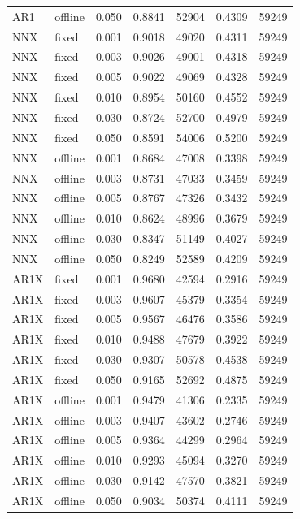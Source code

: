 \documentclass{article}
\begin{document}
\begin{longtable}[htbp]{l|l|l|*{4}{c}}
    AR1 & offline & 0.050 & 0.8841 & 52904 & 0.4309 & 59249\\
    NNX & fixed & 0.001 & 0.9018 & 49020 & 0.4311 & 59249\\
    NNX & fixed & 0.003 & 0.9026 & 49001 & 0.4318 & 59249\\
    NNX & fixed & 0.005 & 0.9022 & 49069 & 0.4328 & 59249\\
    NNX & fixed & 0.010 & 0.8954 & 50160 & 0.4552 & 59249\\
    NNX & fixed & 0.030 & 0.8724 & 52700 & 0.4979 & 59249\\
    NNX & fixed & 0.050 & 0.8591 & 54006 & 0.5200 & 59249\\
    NNX & offline & 0.001 & 0.8684 & 47008 & 0.3398 & 59249\\
    NNX & offline & 0.003 & 0.8731 & 47033 & 0.3459 & 59249\\
    NNX & offline & 0.005 & 0.8767 & 47326 & 0.3432 & 59249\\
    NNX & offline & 0.010 & 0.8624 & 48996 & 0.3679 & 59249\\
    NNX & offline & 0.030 & 0.8347 & 51149 & 0.4027 & 59249\\
    NNX & offline & 0.050 & 0.8249 & 52589 & 0.4209 & 59249\\
    AR1X & fixed & 0.001 & 0.9680 & 42594 & 0.2916 & 59249\\
    AR1X & fixed & 0.003 & 0.9607 & 45379 & 0.3354 & 59249\\
    AR1X & fixed & 0.005 & 0.9567 & 46476 & 0.3586 & 59249\\
    AR1X & fixed & 0.010 & 0.9488 & 47679 & 0.3922 & 59249\\
    AR1X & fixed & 0.030 & 0.9307 & 50578 & 0.4538 & 59249\\
    AR1X & fixed & 0.050 & 0.9165 & 52692 & 0.4875 & 59249\\
    AR1X & offline & 0.001 & 0.9479 & 41306 & 0.2335 & 59249\\
    AR1X & offline & 0.003 & 0.9407 & 43602 & 0.2746 & 59249\\
    AR1X & offline & 0.005 & 0.9364 & 44299 & 0.2964 & 59249\\
    AR1X & offline & 0.010 & 0.9293 & 45094 & 0.3270 & 59249\\
    AR1X & offline & 0.030 & 0.9142 & 47570 & 0.3821 & 59249\\
    AR1X & offline & 0.050 & 0.9034 & 50374 & 0.4111 & 59249\\
\end{longtable}
\end{document}
